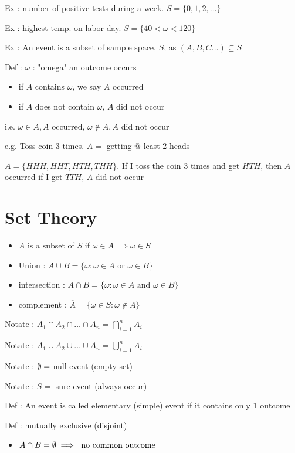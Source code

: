 Ex : number of positive tests during a week. $S = \{0, 1, 2, \ldots \}$  
 
Ex : highest temp. on labor day. $S = \{40 < \omega < 120 \}$ 

Ex : An event is a subset of sample space, $S$, as $(A, B, C \ldots) \subseteq S$

Def :  $\omega$ : "omega" an outcome occurs
 \begin{itemize}
    \item if $A$ contains $\omega$, we say $A$ occurred
    \item if $A$ does not contain $\omega$, $A$ did not occur
\end{itemize}
i.e. $\omega  \in A, A \text{ occurred}$, $\omega \not\in A, A \text{ did not occur}$

e.g. Toss coin 3 times. $A = $ getting @ least 2 heads

$A = \{ HHH, HHT, HTH, THH \}$. If I toss the coin 3 times and get  $HTH$, then $A$ occurred if I get $TTH$, $A$ did not occur

\chapter*{Set Theory}
\begin{itemize}
    \item $A$ is a subset of $S$ if $\omega \in A \implies \omega \in S$ 
    \item Union : $A \cup B = \{ \omega : \omega \in A \text{ or } \omega \in B \}$
    \item intersection : $A \cap B = \{ \omega : \omega \in A \text{ and } \omega \in B \}$
    \item complement : $\overline{A} = \{ \omega \in S : \omega \not\in A \}$
\end{itemize}

Notate : $A_1 \cap A_2 \cap \ldots \cap A_n = \bigcap_{i = 1}^n A_i$

Notate : $A_1 \cup A_2 \cup \ldots \cup A_n = \bigcup_{i = 1}^n A_i$

Notate : $\emptyset = $ null event (empty set)

Notate : $S = $ sure event (always occur)

Def : An event is called elementary (simple) event if it contains only 1 outcome

Def : mutually exclusive (disjoint)

\begin{itemize}
    \item $A \cap B = \emptyset \implies \text{ no common outcome}$
\end{itemize}

